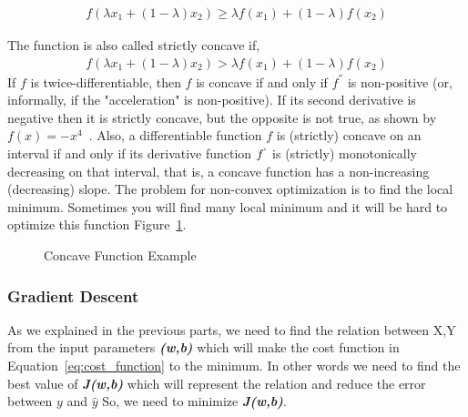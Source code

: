\begin{description}
\begin{equation}\label{eq:concave_fun}
  \begin{split}
f(\lambda x_1 + (1-\lambda)x_2) \geq \lambda f(x_1) + (1 - \lambda) f(x_2)
  \end{split}
\end{equation}

The function is also called strictly concave if,
\begin{equation}\label{eq:concave_fun_strictly}
  \begin{split}
f(\lambda x_1 + (1-\lambda)x_2) > \lambda f(x_1) + (1 - \lambda) f(x_2)
  \end{split}
\end{equation}
If $f$ is twice-differentiable, then $f$ is concave if and only if $f^{''}$ is non-positive (or, informally, if the "acceleration" is non-positive). If its second derivative is negative then it is strictly concave, but the opposite is not true, as shown by $f(x) = −x^4$~\cite{Wiki_Concave_Function}. Also, a differentiable function $f$ is (strictly) concave on an interval if and only if its derivative function $f^`$ is (strictly) monotonically decreasing on that interval, that is, a concave function has a non-increasing (decreasing) slope. The problem for non-convex optimization is to find the local minimum. Sometimes you will find many local minimum and it will be hard to optimize this function Figure~\ref{fig:concave_function}.

\begin{figure}[!h]
\begin{center}


\caption{Concave Function Example }\label{fig:concave_function}
\end{center}
\end{figure}

\end{description}

\subsubsection{Gradient Descent}

As we explained in the previous parts, we need to find the relation between X,Y from the input parameters \textbf{\textit{(w,b)}} which will make the cost function in Equation~\eqref{eq:cost_function} to the minimum. In other words we need to find the best value of \textbf{\textit{J(w,b)}} which will represent the relation and reduce the error between $y$ and $\widehat{y}$  So, we need to minimize \textbf{\textit{J(w,b)}}. 

